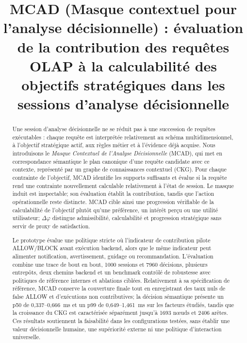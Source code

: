 \documentclass[journal]{IEEEtran}
\begin{document}
\title{MCAD (Masque contextuel pour l'analyse décisionnelle) : évaluation de la contribution des requêtes OLAP à la calculabilité des objectifs stratégiques dans les sessions d'analyse décisionnelle}

\author{}

\maketitle
\pagestyle{plain}
\thispagestyle{plain}

\begin{abstract}
Une session d'analyse décisionnelle ne se réduit pas à une succession de requêtes exécutables : chaque requête est interprétée relativement au schéma multidimensionnel, à l'objectif stratégique actif, aux règles métier et à l'évidence déjà acquise. Nous introduisons le \emph{Masque Contextuel de l'Analyse Décisionnelle} (MCAD), qui met en correspondance sémantique le plan canonique d'une requête candidate avec ce contexte, représenté par un graphe de connaissances contextuel (CKG). Pour chaque contrainte de l'objectif, MCAD identifie les supports suffisants et évalue si la requête rend une contrainte nouvellement calculable relativement à l'état de session. Le masque induit est inspectable; son évaluation établit la contribution, tandis que l'action opérationnelle reste distincte. MCAD cible ainsi une progression vérifiable de la calculabilité de l'objectif plutôt qu'une préférence, un intérêt perçu ou une utilité utilisateur; $\Delta\varphi$ distingue admissibilité, calculabilité et progression stratégique sans servir de proxy de satisfaction.

Le prototype évalue une politique stricte où l'indicateur de contribution pilote ALLOW/BLOCK avant exécution backend, alors que le même indicateur peut alimenter notification, avertissement, guidage ou recommandation. L'évaluation combine une trace de bout en bout, 1000 sessions et 7960 décisions, plusieurs entrepôts, deux chemins backend et un benchmark contrôlé de robustesse avec politiques de référence internes et ablations ciblées. Relativement à sa spécification de référence, MCAD conserve la couverture finale tout en enregistrant des taux nuls de false ALLOW et d'exécutions non contributives; la décision sémantique présente un p50 de 0,337--0,666~ms et un p99 de 0,649--1,461~ms sur les facteurs étudiés, tandis que la croissance du CKG est caractérisée séparément jusqu'à 1693 nœuds et 2406 arêtes. Ces résultats soutiennent la faisabilité dans les configurations testées, sans établir une valeur décisionnelle humaine, une supériorité externe ni une politique d'interaction universelle.
\end{abstract}
\end{document}

